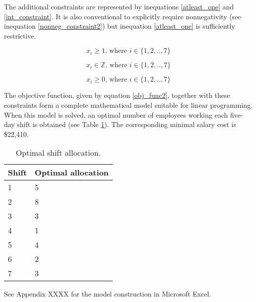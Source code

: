 \documentclass[11pt, a4paper]{article}
\begin{document}
    The additional constraints are represented by inequations \ref{atleast_one} and \ref{int_constraint}. It is also conventional to explicitly require nonnegativity (see inequation \ref{nonneg_constraint2}) but inequation \ref{atleast_one} is sufficiently restrictive.

    \begin{equation}
        x_i \geq 1 \textrm{, where } i \in \{1, 2, .., 7\}
        \label{atleast_one}
    \end{equation}

    \begin{equation}
        x_i \in \mathbb{Z} \textrm{, where } i \in \{1, 2, .., 7\}
        \label{int_constraint}
    \end{equation}

    \begin{equation}
        x_i \geq 0 \textrm{, where } i \in \{1, 2, .., 7\}
        \label{nonneg_constraint2}
    \end{equation}

    The objective function, given by equation \ref{obj_func2}, together with these constraints form a complete mathematical model suitable for linear programming. When this model is solved, an optimal number of employees working each five-day shift is obtained (see Table \ref{results2}). The corresponding minimal salary cost is \$22,410. 

    \begin{table}[!ht]
        \centering
        \caption{Optimal shift allocation.}
        \begin{tabular}{|l|l|}
            \hline
            Shift   & Optimal allocation    \\ \hline
            1       & 5                     \\ \hline
            2       & 8                     \\ \hline
            3       & 3                     \\ \hline
            4       & 1                     \\ \hline
            5       & 4                     \\ \hline
            6       & 2                     \\ \hline
            7       & 3                     \\ \hline
        \end{tabular}
        \label{results2}
    \end{table}

    See Appendix XXXX for the model construction in Microsoft Excel.
\end{document}
